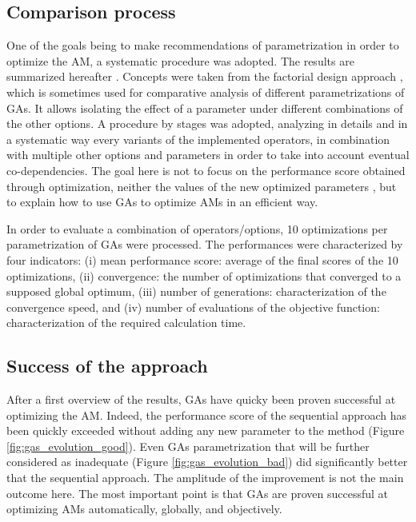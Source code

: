 \documentclass[twocol]{ametsoc}
\begin{document}
\subsection{Comparison process}

One of the goals being to make recommendations of parametrization in order to optimize the AM, a systematic procedure was adopted. The results are summarized hereafter \citep[see][for the details]{Horton2012a}. Concepts were taken from the factorial design approach \citep[see eg.][]{Costa2005a,Costa2007a,Mariano2010a}, which is sometimes used for comparative analysis of different parametrizations of GAs. It allows isolating the effect of a parameter under different combinations of the other options. A procedure by stages was adopted, analyzing in details and in a systematic way every variants of the implemented operators, in combination with multiple other options and parameters in order to take into account eventual co-dependencies. The goal here is not to focus on the performance score obtained through optimization, neither the values of the new optimized parameters \citep[covered in][]{Horton2016b}, but to explain how to use GAs to optimize AMs in an efficient way.

In order to evaluate a combination of operators/options, 10 optimizations per parametrization of GAs were processed. The performances were characterized by four indicators: (i) mean performance score: average of the final scores of the 10 optimizations, (ii) convergence: the number of optimizations that converged to a supposed global optimum, (iii) number of generations: characterization of the convergence speed, and (iv) number of evaluations of the objective function: characterization of the required calculation time.


\subsection{Success of the approach}

After a first overview of the results, GAs have quicky been proven successful at optimizing the AM. Indeed, the performance score of the sequential approach has been quickly exceeded without adding any new parameter to the method (Figure \ref{fig:gas_evolution_good}). Even GAs parametrization that will be further considered as inadequate (Figure \ref{fig:gas_evolution_bad}) did significantly better that the sequential approach. The amplitude of the improvement is not the main outcome here. The most important point is that GAs are proven successful at optimizing AMs automatically, globally, and objectively.
\end{document}

